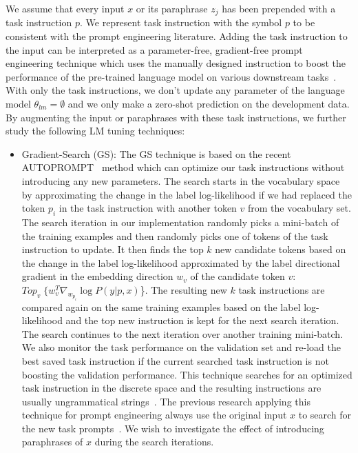 \documentclass[11pt]{article}
\begin{document}
We assume that every input $x$ or its paraphrase $z_j$ has been prepended with a task instruction $p$. We represent task instruction with the symbol $p$ to be consistent with the prompt engineering literature. Adding the task instruction to the input can be interpreted as a parameter-free, gradient-free prompt engineering technique which uses the manually designed instruction to boost the performance of the pre-trained language model on various downstream tasks~\cite{DBLP:journals/corr/abs-2005-14165, petroni-etal-2019-language, deng-etal-2022-rlprompt}. With only the task instructions, we don't update any parameter of the language model $\theta_{lm}=\emptyset$ and we only make a zero-shot prediction on the development data. By augmenting the input or paraphrases with these task instructions, we further study the following LM tuning techniques:
\begin{itemize}
    \item Gradient-Search (GS): The GS technique is based on the recent AUTOPROMPT~\cite{shin-etal-2020-autoprompt} method which can optimize our task instructions without introducing any new parameters. The search starts in the vocabulary space by approximating the change in the label log-likelihood if we had replaced the token $p_{i}$ in the task instruction with another token $v$ from the vocabulary set. The search iteration in our implementation randomly picks a mini-batch of the training examples and then randomly picks one of tokens of the task instruction to update. It then finds the top $k$ new candidate tokens based on the change in the label log-likelihood approximated by the label directional gradient in the embedding direction $w_v$ of the candidate token $v$: $Top_v \; \{w^{T}_{v} \nabla_{w_{p_i}} \log P(y|p,x)$\}. The resulting new $k$ task instructions are compared again on the same training examples based on the label log-likelihood and the top new instruction is kept for the next search iteration. The search continues to the next iteration over another training mini-batch. We also monitor the task performance on the validation set and re-load the best saved task instruction if the current searched task instruction is not boosting the validation performance. This technique searches for an optimized task instruction in the discrete space and the resulting instructions are usually ungrammatical strings~\cite{shin-etal-2020-autoprompt}. The previous research applying this technique for prompt engineering always use the original input $x$ to search for the new task prompts~\cite{shin-etal-2020-autoprompt, deng-etal-2022-rlprompt}. We wish to investigate the effect of introducing paraphrases of $x$ during the search iterations.
    

\end{itemize}
\end{document}
